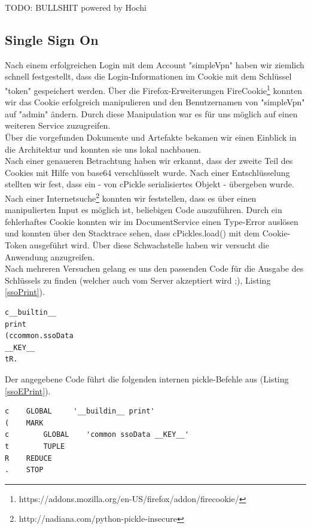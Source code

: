 \documentclass[12pt]{article}
\begin{document}
TODO: BULLSHIT powered by Hochi

\subsection{Single Sign On}

Nach einem erfolgreichen Login mit dem Account "simpleVpn" haben wir ziemlich schnell festgestellt, dass die Login-Informationen im Cookie mit dem Schlüssel "token" gespeichert werden. Über die Firefox-Erweiterungen FireCookie\footnote{https://addons.mozilla.org/en-US/firefox/addon/firecookie/} konnten wir das Cookie erfolgreich manipulieren und den Benutzernamen von "simpleVpn" auf "admin" ändern. Durch diese Manipulation war es für uns möglich auf einen weiteren Service zuzugreifen. \\
Über die vorgefunden Dokumente und Artefakte bekamen wir einen Einblick in die Architektur und konnten sie uns lokal nachbauen. \\
Nach einer genaueren Betrachtung haben wir erkannt, dass der zweite Teil des Cookies mit Hilfe von base64 verschlüsselt wurde. Nach einer Entschlüsselung stellten wir fest, dass ein - von cPickle serialisiertes Objekt - übergeben wurde. Nach einer Internetsuche\footnote{http://nadiana.com/python-pickle-insecure} konnten wir feststellen, dass es über einen manipulierten Input es möglich ist, beliebigen Code auszuführen. Durch ein fehlerhaftes Cookie konnten wir im DocumentService einen Type-Error auslösen und konnten über den Stacktrace sehen, dass cPickles.load() mit dem Cookie-Token ausgeführt wird. Über diese Schwachstelle haben wir versucht die Anwendung anzugreifen.\\
Nach mehreren Versuchen gelang es uns den passenden Code für die Ausgabe des Schlüssels zu finden (welcher auch vom Server akzeptiert wird ;), Listing \ref{ssoPrint}). 
\begin{lstlisting}[caption={Ausgabe von \_\_KEY\_\_ mit Hilfe von print},label=ssoPrint]
c__builtin__
print
(ccommon.ssoData
__KEY__
tR.
\end{lstlisting}



Der angegebene Code führt die folgenden internen pickle-Befehle aus (Listing \ref{ssoEPrint}). 
\begin{lstlisting}[caption={Erklärung des pickle-Codes},label=ssoEPrint]
c    GLOBAL     '__buildin__ print'
(    MARK
c        GLOBAL    'common ssoData __KEY__'
t        TUPLE      
R    REDUCE
.    STOP
\end{lstlisting}
\end{document}
